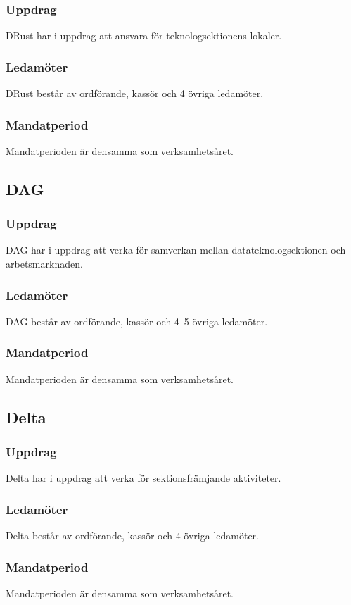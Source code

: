 \subsubsection{Uppdrag}
DRust har i uppdrag att ansvara för teknologsektionens lokaler.
\subsubsection{Ledamöter}
DRust består av ordförande, kassör och 4 övriga ledamöter.
\subsubsection{Mandatperiod}
Mandatperioden är densamma som verksamhetsåret. 

\subsection{DAG}
\subsubsection{Uppdrag} 
DAG har i uppdrag att verka för samverkan mellan datateknologsektionen och arbetsmarknaden. 
\subsubsection{Ledamöter}
DAG består av ordförande, kassör och 4--5 övriga ledamöter.
\subsubsection{Mandatperiod}
Mandatperioden är densamma som verksamhetsåret.

\subsection{Delta}
\subsubsection{Uppdrag}
Delta har i uppdrag att verka för sektionsfrämjande aktiviteter. 
\subsubsection{Ledamöter}
Delta består av ordförande, kassör och 4 övriga ledamöter.
\subsubsection{Mandatperiod}
Mandatperioden är densamma som verksamhetsåret. 

